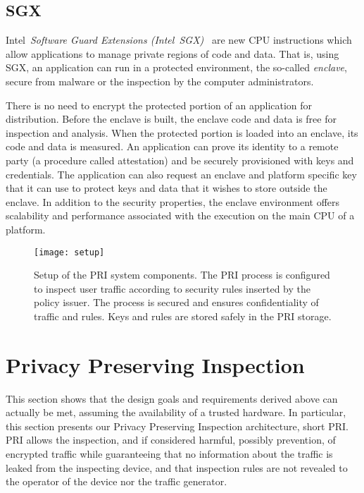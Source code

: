 \documentclass{sig-alternate-10pt}
\newcommand{\sys}{PRI\xspace}
\begin{document}
\subsection{SGX}

Intel~\emph{Software Guard Extensions 
(Intel~SGX)}~\cite{sgxr3,sgxr1,sgxr2,white}
are new CPU instructions which allow 
applications to manage private regions of code and data. 
That is, using SGX, 
an application can run in a protected
environment, the so-called \emph{enclave},
secure from malware
or the  
inspection by the computer administrators.

There is no need to encrypt the protected portion of an application 
for distribution. Before the enclave is built, the 
enclave code and data is free for inspection and analysis. 
When the protected portion is loaded into an enclave,
its 
code and data is measured. 
An application can prove its 
identity to a remote party (a procedure called attestation) 
and be securely provisioned 
with keys and credentials. The application can also request an 
enclave and platform specific key that it can use to protect 
keys and data that it wishes to store outside the enclave.
In addition to the security properties, the enclave environment 
offers scalability and performance associated with the execution 
on the main CPU of a platform.

\begin{figure}[t!]
\centering
\texttt{[image: setup]}
\caption{
Setup of the PRI system components.
The \sys process is configured to inspect user traffic according to security rules inserted by the policy issuer. The process is secured and ensures confidentiality of traffic and rules. Keys and rules are stored safely in the \sys storage.}\label{fig:fig1}
\end{figure}


\section{Privacy Preserving Inspection}\label{sec:ppi}

This section shows that the design goals and requirements
derived above can actually be met, assuming the availability
of a trusted hardware. In particular, this section 
presents our Privacy Preserving Inspection 
architecture, short \sys. \sys 
allows the inspection, and if considered harmful, possibly prevention,
of encrypted traffic while guaranteeing that no information about the traffic is 
leaked from the inspecting device, and that inspection rules are not revealed to the 
operator of the device nor the traffic generator.
\end{document}
